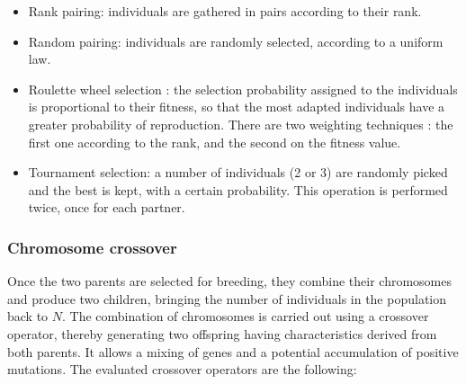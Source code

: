 \documentclass{ametsoc}
\begin{document}
\begin{itemize}
	\item Rank pairing: individuals are gathered in pairs according to their rank.
	
	\item Random pairing: individuals are randomly selected, according to a uniform law.
	
	\item Roulette wheel selection \citep{Goldberg1989}: the selection probability assigned to the individuals is proportional to their fitness, so that the most adapted individuals have a greater probability of reproduction. There are two weighting techniques : the first one according to the rank, and the second on the fitness value.
	
	\item Tournament selection: a number of individuals (2 or 3) are randomly picked and the best is kept, with a certain probability. This operation is performed twice, once for each partner.
\end{itemize}


\subsubsection{Chromosome crossover}
\label{sec:gas:crossover}

Once the two parents are selected for breeding, they combine their chromosomes and produce two children, bringing the number of individuals in the population back to $N$. The combination of chromosomes is carried out using a crossover operator, thereby generating two offspring having characteristics derived from both parents. It allows a mixing of genes and a potential accumulation of positive mutations. The evaluated crossover operators are the following:
\end{document}
